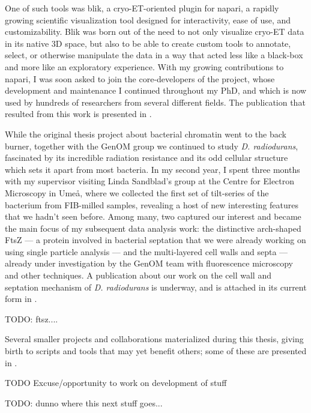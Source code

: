 One of such tools was blik, a cryo-ET-oriented plugin for napari, a rapidly growing scientific visualization tool designed for interactivity, ease of use, and customizability.
Blik was born out of the need to not only visualize cryo-ET data in its native 3D space, but also to be able to create custom tools to annotate, select, or otherwise manipulate the data in a way that acted less like a black-box and more like an exploratory experience.
With my growing contributions to napari, I was soon asked to join the core-developers of the project, whose development and maintenance I continued throughout my PhD, and which is now used by hundreds of researchers from several different fields.
The publication that resulted from this work is presented in .

While the original thesis project about bacterial chromatin went to the back burner, together with the GenOM group we continued to study \textit{D. radiodurans}, fascinated by its incredible radiation resistance and its odd cellular structure which sets it apart from most bacteria.
In my second year, I spent three months with my supervisor visiting Linda Sandblad's group at the Centre for Electron Microscopy in Umeå, where we collected the first set of tilt-series of the bacterium from FIB-milled samples, revealing a host of new interesting features that we hadn't seen before.
Among many, two captured our interest and became the main focus of my subsequent data analysis work: the distinctive arch-shaped FtsZ --- a protein involved in bacterial septation that we were already working on using single particle analysis --- and the multi-layered cell walls and septa --- already under investigation by the GenOM team with fluorescence microscopy and other techniques.
A publication about our work on the cell wall and septation mechanism of \textit{D. radiodurans} is underway, and is attached in its current form in .

TODO: ftsz....

Several smaller projects and collaborations materialized during this thesis, giving birth to scripts and tools that may yet benefit others; some of these are presented in . 

TODO Excuse/opportunity to work on development of stuff

TODO: dunno where this next stuff goes...

